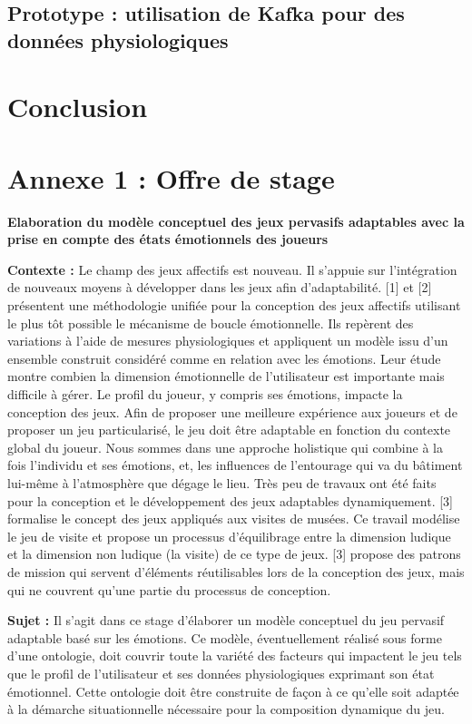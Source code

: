 \documentclass{article}
\begin{document}
	\subsection{Prototype : utilisation de Kafka pour des données physiologiques}

\section{Conclusion}




\newpage
\appendix
\section{Annexe 1 : Offre de stage}\label{app:annexe1}
	\textbf{Elaboration du modèle conceptuel des jeux pervasifs adaptables avec la prise en compte des états émotionnels des joueurs}\par
	\medskip
	\textbf{Contexte :}\newline
	Le champ des jeux affectifs est nouveau. Il s’appuie sur l’intégration de nouveaux moyens à développer dans les jeux afin d’adaptabilité. [1] et [2] présentent une méthodologie unifiée pour la conception des jeux affectifs utilisant le plus tôt possible le mécanisme de boucle émotionnelle. Ils repèrent des variations à l’aide de mesures physiologiques et appliquent un modèle issu d’un ensemble construit considéré comme en relation avec les émotions. Leur étude montre combien la dimension émotionnelle de l’utilisateur est importante mais difficile à gérer.\newline
	Le profil du joueur, y compris ses émotions, impacte la conception des jeux. Afin de proposer une meilleure expérience aux joueurs et de proposer un jeu particularisé, le jeu doit être adaptable en fonction du contexte global du joueur. Nous sommes dans une approche holistique qui combine à la fois l’individu et ses émotions, et, les influences de l’entourage qui va du bâtiment lui-même à l’atmosphère que dégage le lieu. Très peu de travaux ont été faits pour la conception et le développement des jeux adaptables dynamiquement. [3] formalise le concept des jeux appliqués aux visites de musées. Ce travail modélise le jeu de visite et propose un processus d’équilibrage entre la dimension ludique et la dimension non ludique (la visite) de ce type de jeux. [3] propose des patrons de mission qui servent d’éléments réutilisables lors de la conception des jeux, mais qui ne couvrent qu’une partie du processus de conception.\par
	\textbf{Sujet :}\newline
	Il s’agit dans ce stage d’élaborer un modèle conceptuel du jeu pervasif adaptable basé sur les émotions. Ce modèle, éventuellement réalisé sous forme d’une ontologie, doit couvrir toute la variété des facteurs qui impactent le jeu tels que le profil de l’utilisateur et ses données physiologiques exprimant son état émotionnel. Cette ontologie doit être construite de façon à ce qu’elle soit adaptée à la démarche situationnelle nécessaire pour la composition dynamique du jeu.
\end{document}
